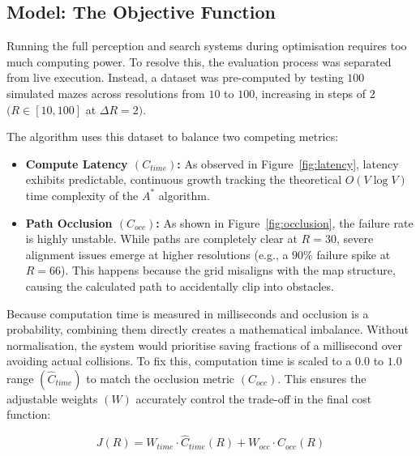 \documentclass[12pt, a4paper]{article}
\begin{document}
\vspace{0.25cm}

\subsection{Model: The Objective Function}

\quad Running the full perception and search systems during optimisation requires too much computing power. To resolve this, the evaluation process was separated from live execution. Instead, a dataset was pre-computed by testing $100$ simulated mazes across resolutions from $10$ to $100$, increasing in steps of $2$ $(R \in [10, 100]$ at $\Delta R = 2)$.

\vspace{0.5cm}

\hspace{-1.5em}The algorithm uses this dataset to balance two competing metrics:

\begin{itemize}
    \item \textbf{Compute Latency $(C_{time})$:} As observed in Figure~\ref{fig:latency}, latency exhibits predictable, continuous growth tracking the theoretical $O(V \log V)$ time complexity of the $A^*$ algorithm.

    \item \textbf{Path Occlusion $(C_{occ})$:} As shown in Figure~\ref{fig:occlusion}, the failure rate is highly unstable. While paths are completely clear at $R=30$, severe alignment issues emerge at higher resolutions (e.g., a $90\%$ failure spike at $R=66$). This happens because the grid misaligns with the map structure, causing the calculated path to accidentally clip into obstacles.
\end{itemize}

Because computation time is measured in milliseconds and occlusion is a probability, combining them directly creates a mathematical imbalance. Without normalisation, the system would prioritise saving fractions of a millisecond over avoiding actual collisions. To fix this, computation time is scaled to a $0.0$ to $1.0$ range $(\hat{C}_{time})$ to match the occlusion metric $(C_{occ})$. This ensures the adjustable weights $(W)$ accurately control the trade-off in the final cost function:

$$J(R) = W_{time} \cdot \hat{C}_{time}(R) + W_{occ} \cdot C_{occ}(R)$$
\end{document}
